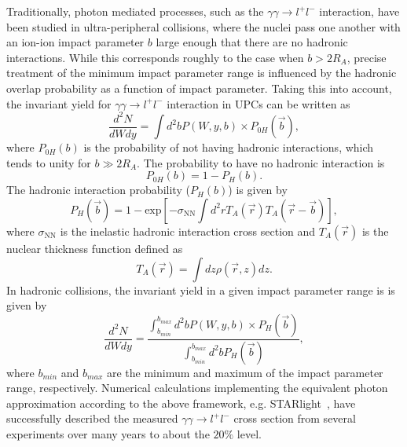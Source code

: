 \documentclass[12pt,epjc3]{svjour3}\sloppy
\begin{document}
Traditionally, photon mediated processes, such as the $\gamma\gamma\rightarrow l^+l^-$ interaction, have been studied in ultra-peripheral collisions, where the nuclei pass one another with an ion-ion impact parameter $b$ large enough that there are no hadronic interactions. While this corresponds roughly to the case when $b > 2R_A$, precise treatment of the minimum impact parameter range is influenced by the hadronic overlap probability as a function of impact parameter. Taking this into account, the invariant yield for $\gamma\gamma\rightarrow l^+l^-$ interaction in UPCs can be written as
\begin{equation}
  \frac{d^{2}N}{dWdy}=\int d^{2}b P(W,y,b) \times P_{0H}(\vec{b}),
  \label{equation16}
\end{equation}
where $P_{0H}(b)$ is the probability of not having hadronic interactions, which tends to unity for $b\gg2R_A$. The probability to have no hadronic interaction is 
\begin{equation}
    P_{0H}(b) = 1 - P_{H}(b).
\end{equation}
The hadronic interaction probability ($P_{H}(b)$) is given by
\begin{equation}
  P_{H}(\vec{b}) = 1 - \text{exp}\left[-\sigma_{\text{NN}} \int d^{2}r T_{A}(\vec{r})T_{A}(\vec{r}-\vec{b})\right],
  \label{equation9}
\end{equation}
where $\sigma_{\text{NN}}$ is the inelastic hadronic interaction cross section and $T_{A}(\vec{r})$ is the nuclear thickness function defined as
\begin{equation}
    T_{A}(\vec{r}) = \int dz \rho(\vec{r},z)dz.
  \label{equation10}
\end{equation}
In hadronic collisions, the invariant yield in a given impact parameter range is is given by
\begin{equation}
  \frac{d^{2}N}{dWdy}=\frac{\int^{b_{max}}_{b_{min}} d^{2}b P(W,y,b) \times P_{H}(\vec{b})}{\int^{b_{max}}_{b_{min}} d^{2}b P_{H}(\vec{b})},
  \label{equation16}
\end{equation}
where $b_{min}$ and $b_{max}$ are the minimum and maximum of the impact parameter range, respectively. 
Numerical calculations implementing the equivalent photon approximation according to the above framework, e.g. STARlight~\cite{kleinSTARlightMonteCarlo2017b}, have successfully described the measured $\gamma\gamma \rightarrow l^+l^-$ cross section from several experiments over many years to about the $20\%$ level\cite{abbasCharmoniumPairPhotoproduction2013a,starcollaborationProductionEnsuremathPairs2004,atlascollaborationExclusiveDimuonProduction2020}. 
\end{document}
